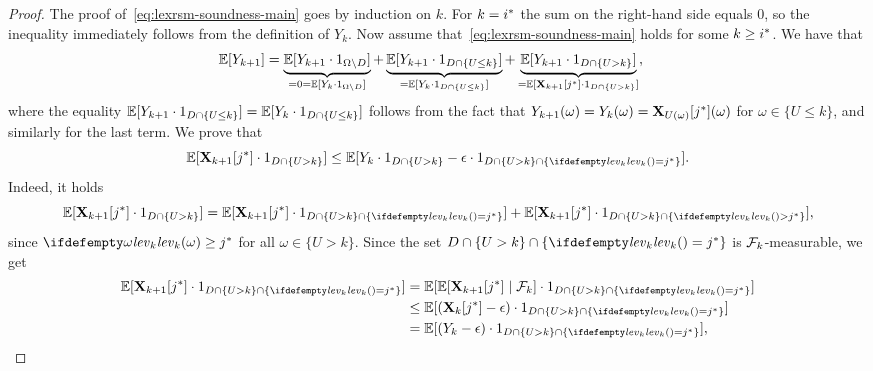 \begin{proof}
The proof of~\eqref{eq:lexrsm-soundness-main} goes by induction on $k$. For 
$k={i}^*$ the sum on the right-hand side equals $0$, so the 
inequality immediately follows from the definition of $Y_k$. Now assume 
that~\eqref{eq:lexrsm-soundness-main} holds for some $k\geq {i}^*$. We have that 
\begin{align}
\label{eq:lexrsm-ind-1}
\mathbb{E}[Y_{k+1}] &= \underbrace{\mathbb{E}[Y_{k+1}\cdot {1}_{\Omega\setminus D}]}_{=0=\mathbb{E}[Y_k\cdot{1}_{\Omega\setminus D}]} +  \underbrace{\mathbb{E}[Y_{k+1}\cdot {1}_{D \cap \{U \leq k\}}]}_{=\mathbb{E}[Y_k\cdot{1}_{D\cap \{U\leq k\}}]} + \underbrace{\mathbb{E}[Y_{k+1}\cdot {1}_{D \cap \{U > k\}}]}_{=\mathbb{E}[\mathbf{X}_{k+1}[{j}^*]\cdot{1}_{D\cap \{U>k \} }]},
\end{align}
where the equality $\mathbb{E}[Y_{k+1}\cdot {1}_{D \cap \{U \leq k\}}] =\mathbb{E}[Y_k\cdot{1}_{D\cap \{U\leq k\}}] $ follows from the fact that $Y_{k+1}(\omega)=Y_k({\omega})=\mathbf{X}_{U(\omega)}[{j}^*](\omega)$ for $\omega\in \{U\leq k\}$, and similarly for the last term. We prove that 
\begin{equation}
\label{eq:lexrsm-ind-2}
\E[\vecseq{X}{k+1}{\fixn{j}}\cdot \indicator{D\cap \{U > k \}}] \leq \E[Y_k\cdot \indicator{D\cap \{U > k \}} -\eps\cdot \indicator{D\cap \{U>k\} \cap \{\levelrank{}{k}= \fixn{j}\} }] .
\end{equation}
Indeed, it holds
\begin{equation}
\label{eq:lexrsm-ind-3}
\E[\vecseq{X}{k+1}{\fixn{j}}\cdot \indicator{D\cap \{U > k \}}] = \E[\vecseq{X}{k+1}{\fixn{j}}\cdot \indicator{D\cap \{U > k \} \cap \{\levelrank{}{k}=\fixn{j} \} }]  + \E[\vecseq{X}{k+1}{\fixn{j}}\cdot \indicator{D\cap \{U > k \} \cap \{\levelrank{}{k}>\fixn{j}\} }], 
\end{equation}
since $\levelrank{\omega}{k}\geq \fixn{j}$ for all $\omega \in \{U>k\}$. Since the set $D\cap \{U > k \} \cap \{\levelrank{}{k}=\fixn{j} \}$ is $\mathcal{F}_k$-measurable, we get
\begin{align}
\E[\vecseq{X}{k+1}{\fixn{j}}\cdot \indicator{D\cap \{U > k \} \cap \{\levelrank{}{k}=\fixn{j} \} }] &= \E[\E[\vecseq{X}{k+1}{\fixn{j}}\mid \genfilt_k]\cdot \indicator{D\cap \{U > k \} \cap \{\levelrank{}{k}=\fixn{j} \} }] \label{eq:lexrsm-ind-4}\\
&\leq \E[(\vecseq{X}{k}{\fixn{j}} - \eps)\cdot \indicator{D\cap \{U > k \} \cap \{\levelrank{}{k}=\fixn{j} \}}] \label{eq:lexrsm-ind-5}\\
&=\E[(Y_k - \eps)\cdot \indicator{D\cap \{U > k \} \cap \{\levelrank{}{k}=\fixn{j} \}}] \label{eq:lexrsm-ind-6},

\end{align}
\end{proof}
